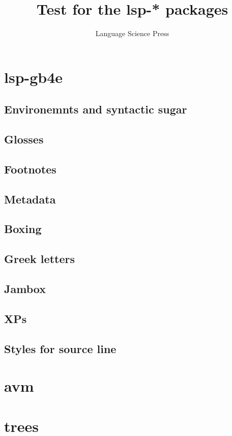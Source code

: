\documentclass[a4paper,10pt]{article}
\title{Test for the lsp-* packages}
\author{Language Science Press}
\begin{document}
\maketitle

\section{lsp-gb4e}
\subsection{Environemnts and syntactic sugar}

% 







\subsection{Glosses}


% 



\subsection{Footnotes}




\subsection{Metadata}

\subsection{Boxing}

\subsection{Greek letters}

\subsection{Jambox}



\subsection{XPs}

% 
% 
% 

\subsection{Styles for source line}



% 
% 
% 
% 


\section{avm}
\section{trees}
\end{document}
